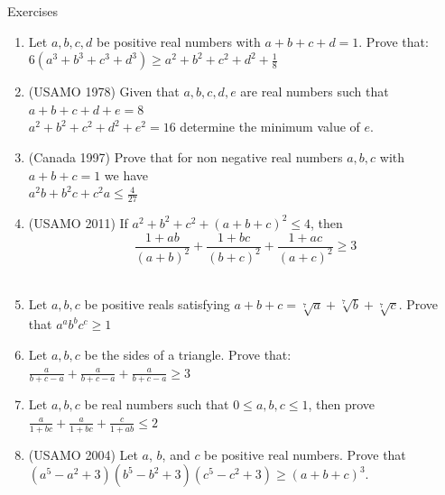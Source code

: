 \begin{xcb} {Exercises}
    \begin{enumerate}
\item  Let $a,b,c,d$ be positive real numbers with $a+b+c+d=1$. Prove that:\\
$6(a^3+b^3+c^3+d^3) \geq a^2+b^2+c^2+d^2+\frac{1}{8}$
\item (USAMO 1978) Given that $a, b, c, d, e$ are real numbers such that $a + b + c + d + e = 8$\\
$a^2 + b^2 + c^2 + d^2 + e^2 = 16$
determine the minimum value of $e$.
\item (Canada 1997)  Prove that for non negative real numbers $a, b, c$ with $a + b + c = 1$ we have\\
$a^2b + b^2c + c^2a \leq \frac{4}{27}$
\item (USAMO 2011) If $a^2 + b^2 + c^2 + (a + b + c)^2 \leq 4$, then\\
\[\frac{1+ab}{(a+b)^2}+\frac{1+bc}{(b+c)^2}+\frac{1+ac}{(a+c)^2} \geq 3\]\\
\item Let $a, b, c$ be positive reals satisfying $a + b + c = \sqrt[7]{a}+\sqrt[7]{b}+\sqrt[7]{c}$.  Prove that $a^a b^bc^c \geq 1$
\item Let $a,b,c$ be the sides of a triangle. Prove that:\\
$\frac{a}{b+c-a}+\frac{a}{b+c-a}+\frac{a}{b+c-a} \geq 3$\\
\item Let $a,b,c$ be real numbers such that $0 \leq a,b,c \leq 1$, then prove\\
$\frac{a}{1+bc}+\frac{a}{1+bc}+\frac{c}{1+ab} \leq 2$
\item (USAMO 2004) Let $a$, $b$, and $c$ be positive real numbers. Prove that
$(a^5 - a^2 + 3)(b^5 - b^2 + 3)(c^5 - c^2 + 3) \ge (a+b+c)^3$.
\end{enumerate}
\end{xcb}